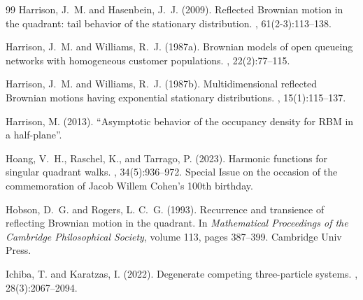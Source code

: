 \documentclass[11pt]{article}
\theoremstyle{definition}
\begin{document}
\begin{thebibliography}{99}
Harrison, J.~M. and Hasenbein, J.~J. (2009).
\newblock Reflected {Brownian} motion in the quadrant: tail behavior of the
  stationary distribution.
, 61(2-3):113--138.

Harrison, J.~M. and Williams, R.~J. (1987a).
\newblock Brownian models of open queueing networks with homogeneous customer
  populations.
, 22(2):77--115.

Harrison, J.~M. and Williams, R.~J. (1987b).
\newblock Multidimensional reflected {Brownian} motions having exponential
  stationary distributions.
, 15(1):115--137.

Harrison, M. (2013).
 ``{A}symptotic behavior of the occupancy
  density for {R}{B}{M} in a half-plane''.

Hoang, V.~H., Raschel, K., and Tarrago, P. (2023).
\newblock Harmonic functions for singular quadrant walks.
, 34(5):936--972.
\newblock Special Issue on the occasion of the commemoration of Jacob Willem
  Cohen’s 100th birthday.

Hobson, D.~G. and Rogers, L. C.~G. (1993).
\newblock Recurrence and transience of reflecting {Brownian} motion in the
  quadrant.
\newblock In {\em Mathematical {Proceedings} of the {Cambridge} {Philosophical}
  {Society}}, volume 113, pages 387--399. Cambridge Univ Press.

Ichiba, T. and Karatzas, I. (2022).
\newblock Degenerate competing three-particle systems.
, 28(3):2067--2094.
%



\end{thebibliography}
\end{document}
